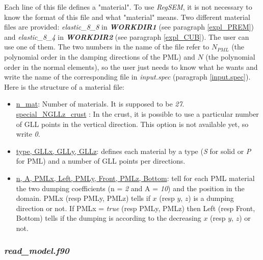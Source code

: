 Each line of this file defines a "material". To use \textit{RegSEM}, it is not necessary to know the format of
this file and what "material" means. Two different material files are provided: \textit{elastic\_8\_8} in
\textit{\bfseries WORKDIR1} (see paragraph \ref{expl_PREM}) and \textit{elastic\_8\_4} in \textit{\bfseries
WORKDIR2} (see paragraph \ref{expl_CUB}). The user can use one of them. The two numbers in the name of the file
refer to $N_{PML}$ (the polynomial order in the damping directions of the PML) and $N$ (the polynomial order in
the normal elements), so the user just needs to know what he wants and write the name of the corresponding
file in \textit{input.spec} (paragraph \ref{input.spec}).\\

Here is the structure of a material file:

\renewcommand{\labelitemii}{}
\begin{itemize}[topsep=2pt,itemsep=10pt]

\item\underline{n\_mat}: Number of materials.
It is supposed to be \textit{27}.\\
\underline{special\_NGLLz\_crust} : In the crust, it is possible to use a particular number of GLL points in
the vertical direction. This option is not available yet, so write \textit{0}.

\item\underline{type, GLLx, GLLy, GLLz}: defines each material by a type (\textit{S} for solid or
\textit{P} for PML) and a number of GLL points per directions.

\item\underline{n, A, PMLx, Left, PMLy, Front, PMLz, Bottom}: tell for each PML material the two dumping
coefficients (n = \textit{2} and A = \textit{10}) and the position in the domain.
PMLx (resp PMLy, PMLz) tells if $x$ (resp $y$, $z$) is a dumping direction or not. If PMLx = \textit{true} 
(resp PMLy, PMLz) then Left (resp Front, Bottom) tells if the dumping is according to the decreasing $x$
(resp $y$, $z$) or not.

\end{itemize}


\subsubsection{\textit{read\_model.f90}}
\label{readmodel}


